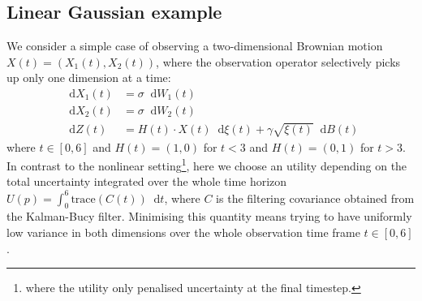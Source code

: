 \documentclass[10pt]{article}
\numberwithin{equation}{section}
\numberwithin{figure}{section}
\theoremstyle{remark}
\newcommand{\tr}{\mathrm{trace}}
\newcommand{\dd }{\mathop{}\!\mathrm{d}}
\begin{document}
\subsection{Linear Gaussian example}\label{sec:2dexample}
We consider a simple case of observing a two-dimensional Brownian motion $X(t) = (X_1(t),X_2(t))$, where the observation operator selectively picks up only one dimension at a time:
\begin{align*}
    \dd X_1(t) &= \sigma \dd W_1(t)\\
    \dd X_2(t) &= \sigma \dd W_2(t)\\
    \dd Z(t) &= H(t)\cdot X(t) \dd\xi(t) + \gamma \sqrt{\xi(t)}\dd B(t)
\end{align*}
where $t\in [0,6]$ and $H(t) = (1, 0)$ for $t < 3$ and $H(t) = (0,1)$ for $t > 3$. In contrast to the nonlinear setting\footnote{where the utility only penalised uncertainty at the final timestep.}, here we choose an utility depending on the total uncertainty integrated over the whole time horizon $U(p) = \int_0^6 \tr(C(t))\dd t$, where $C$ is the filtering covariance obtained from the Kalman-Bucy filter. Minimising this quantity means trying to have uniformly low variance in both dimensions over the whole observation time frame $t\in[0,6]$.
\end{document}
